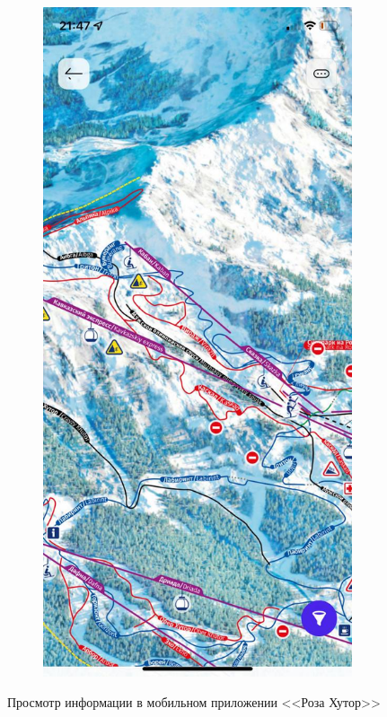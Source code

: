 \begin{figure}[h!]
\begin{center}
\begin{subfigure}{.33\textwidth}
			\label{img:rlift}
			\captionsetup{justification=centering}
			\caption{}
		\end{subfigure}%
		\begin{subfigure}{.33\textwidth}
			\centering
			\includegraphics[width=.95\linewidth]{../imgs/analogue_apps/rmap.png}
			\label{img:rmap}
			\captionsetup{justification=centering}
			\caption{}
		\end{subfigure}
		\captionsetup{justification=centering}
		\caption{Просмотр информации в мобильном приложении <<Роза Хутор>>}
		\label{img:r}
	\end{center}
\end{figure}


